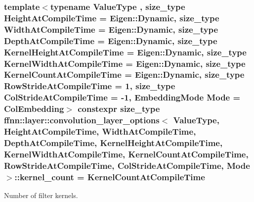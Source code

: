\hypertarget{structffnn_1_1layer_1_1convolution__layer__options_a666df8b2074fb8e749f4a8ecd7d89957}{
\subsubsection[{kernel\-\_\-count}]{\setlength{\rightskip}{0pt plus 5cm}template$<$typename Value\-Type , size\-\_\-type Height\-At\-Compile\-Time = Eigen\-::\-Dynamic, size\-\_\-type Width\-At\-Compile\-Time = Eigen\-::\-Dynamic, size\-\_\-type Depth\-At\-Compile\-Time = Eigen\-::\-Dynamic, size\-\_\-type Kernel\-Height\-At\-Compile\-Time = Eigen\-::\-Dynamic, size\-\_\-type Kernel\-Width\-At\-Compile\-Time = Eigen\-::\-Dynamic, size\-\_\-type Kernel\-Count\-At\-Compile\-Time = Eigen\-::\-Dynamic, size\-\_\-type Row\-Stride\-At\-Compile\-Time = 1, size\-\_\-type Col\-Stride\-At\-Compile\-Time = -\/1, Embedding\-Mode Mode = Col\-Embedding$>$ constexpr {\bf size\-\_\-type} {\bf ffnn\-::layer\-::convolution\-\_\-layer\-\_\-options}$<$ Value\-Type, Height\-At\-Compile\-Time, Width\-At\-Compile\-Time, Depth\-At\-Compile\-Time, Kernel\-Height\-At\-Compile\-Time, Kernel\-Width\-At\-Compile\-Time, Kernel\-Count\-At\-Compile\-Time, Row\-Stride\-At\-Compile\-Time, Col\-Stride\-At\-Compile\-Time, Mode $>$\-::kernel\-\_\-count = Kernel\-Count\-At\-Compile\-Time\hspace{0.3cm}{\ttfamily [static]}}}\label{structffnn_1_1layer_1_1convolution__layer__options_a666df8b2074fb8e749f4a8ecd7d89957}


Number of filter kernels. 

